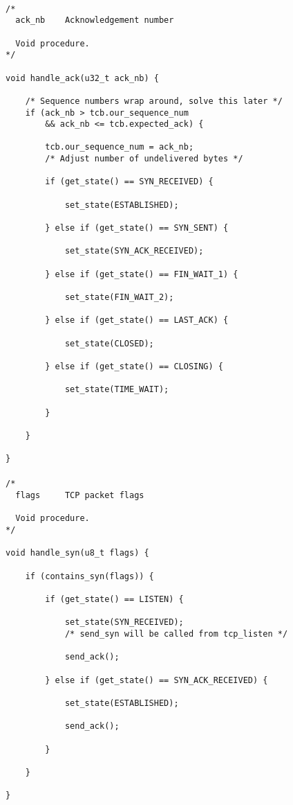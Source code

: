 \documentclass[11pt]{article}
\begin{document}
\paragraph{}


\begin{lstlisting}[title=Procedure handle\_ack]
/*
  ack_nb    Acknowledgement number

  Void procedure.
*/

void handle_ack(u32_t ack_nb) {

    /* Sequence numbers wrap around, solve this later */
    if (ack_nb > tcb.our_sequence_num
        && ack_nb <= tcb.expected_ack) {

        tcb.our_sequence_num = ack_nb;
        /* Adjust number of undelivered bytes */

        if (get_state() == SYN_RECEIVED) {

            set_state(ESTABLISHED);

        } else if (get_state() == SYN_SENT) {

            set_state(SYN_ACK_RECEIVED);

        } else if (get_state() == FIN_WAIT_1) {

            set_state(FIN_WAIT_2);

        } else if (get_state() == LAST_ACK) {

            set_state(CLOSED);

        } else if (get_state() == CLOSING) {

            set_state(TIME_WAIT);

        }

    }

}
\end{lstlisting}


\paragraph{}


\begin{lstlisting}[title=Procedure handle\_syn]
/*
  flags     TCP packet flags

  Void procedure.
*/

void handle_syn(u8_t flags) {

    if (contains_syn(flags)) {

        if (get_state() == LISTEN) {

            set_state(SYN_RECEIVED);
            /* send_syn will be called from tcp_listen */

            send_ack();

        } else if (get_state() == SYN_ACK_RECEIVED) {

            set_state(ESTABLISHED);

            send_ack();

        }

    }

}
\end{lstlisting}
\end{document}
